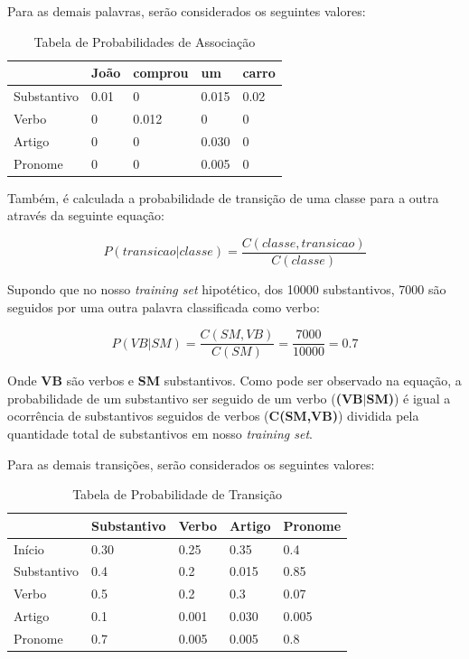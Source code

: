 Para as demais palavras, serão considerados os seguintes valores:

\begin{table}[htb]
\centering
\begin{tabular}{|l|l|l|l|l|}
\hline
            & João & comprou & um    & carro \\ \hline
Substantivo & 0.01 & 0       & 0.015 & 0.02  \\ \hline
Verbo       & 0    & 0.012   & 0     & 0     \\ \hline
Artigo      & 0    & 0       & 0.030 & 0     \\ \hline
Pronome     & 0    & 0       & 0.005 & 0     \\ \hline
\end{tabular}
\caption{Tabela de Probabilidades de Associação}
\label{tabela:associacao}
\end{table}

Também, é calculada a probabilidade de transição de uma classe para a outra
através da seguinte equação:

\[ P(transicao|classe) = \frac{C(classe,transicao)}{C(classe)} \]

Supondo que no nosso
\textit{training set} hipotético, dos 10000 substantivos, 7000 são seguidos por
uma outra palavra classificada como verbo:

\[ P(VB|SM) = \frac{C(SM,VB)}{C(SM)} = \frac{7000}{10000} = 0.7 \]

Onde \textbf{VB} são verbos e \textbf{SM} substantivos. Como pode ser observado
na equação, a probabilidade de um substantivo ser seguido de um verbo
(\textbf{(VB$\vert$SM)}) é igual a ocorrência de substantivos seguidos de verbos (\textbf{C(SM,VB)})
dividida pela quantidade total de substantivos em nosso \textit{training set}.

Para as demais transições, serão considerados os seguintes valores:

\begin{table}[htb]
\centering
\begin{tabular}{|l|l|l|l|l|}
\hline
            & Substantivo & Verbo & Artigo & Pronome \\ \hline
Início      & 0.30        & 0.25  & 0.35   & 0.4     \\ \hline
Substantivo & 0.4         & 0.2   & 0.015  & 0.85    \\ \hline
Verbo       & 0.5         & 0.2   & 0.3    & 0.07    \\ \hline
Artigo      & 0.1         & 0.001 & 0.030  & 0.005   \\ \hline
Pronome     & 0.7         & 0.005 & 0.005  & 0.8     \\ \hline
\end{tabular}
\caption{Tabela de Probabilidade de Transição}
\label{tabela:transicao}
\end{table} 

